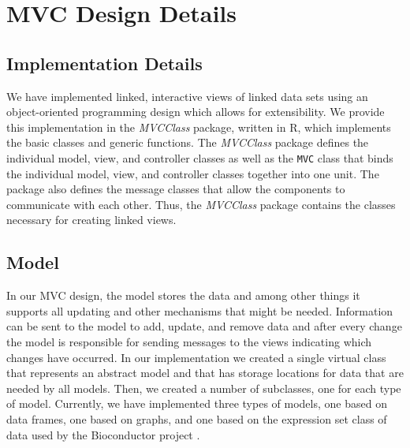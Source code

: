 \documentclass[11pt]{article}
\newcommand{\Rpackage}[1]{{\textit{#1}}}
\newcommand{\Rclass}[1]{\texttt{#1}}
\begin{document}
\section{MVC Design Details}
\label{Sec:OneMVC}

\subsection{Implementation Details}
\label{SSec:OneOver}

We have implemented linked, interactive views of linked data sets
using an object-oriented programming design which allows for
extensibility.  We provide this implementation in the
\Rpackage{MVCClass} package, written in R, which implements the basic
classes and generic functions.  The \Rpackage{MVCClass} package
defines the individual model, view, and controller classes as well as
the \Rclass{MVC} class that binds the individual model, view, and
controller classes together into one unit.  The package also defines
the message classes that allow the components to communicate with each
other.  Thus, the \Rpackage{MVCClass} package contains the classes
necessary for creating linked views.

\subsection{Model}
\label{Ssec:OneModel}

In our MVC design, the model stores the data and among other things it
supports all updating and other mechanisms that might be needed.
Information can be sent to the model to add, update, and remove data
and after every change the model is responsible for sending messages
to the views indicating which changes have occurred.  In our
implementation we created a single virtual class that represents an
abstract model and that has storage locations for data that are
needed by all models.  Then, we created a number of subclasses, one for
each type of model.  Currently, we have implemented three types of models, 
one based on data frames, one based on graphs, and one based on the 
expression set class of data used by the Bioconductor project \citep{BIOC}.


\end{document}
